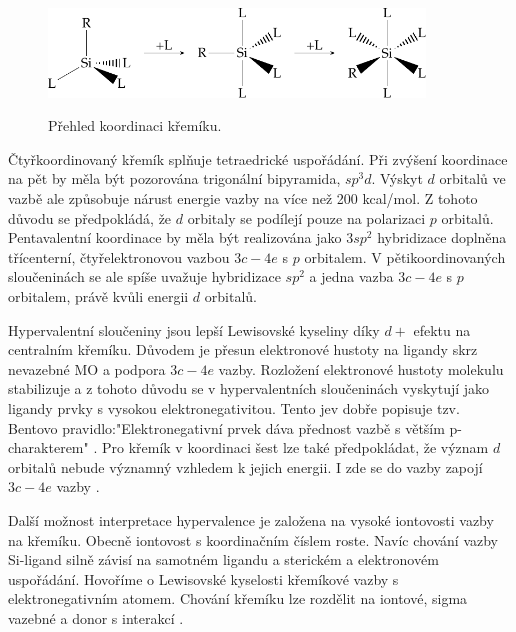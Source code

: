 \documentclass[
  digital, %
  table,   %
  lof,     %
  lot,     %
  oneside,
]{fithesis3}
\begin{document}
\begin{figure}
\caption{Přehled koordinaci křemíku.}
\center \includegraphics[width=10cm]{drawing.pdf} \label{prehled_koordinaci} \end{figure}

Čtyřkoordinovaný křemík splňuje tetraedrické uspořádání. Při zvýšení koordinace na pět by měla být pozorována trigonální bipyramida, $sp^3d$. Výskyt $d$ orbitalů ve vazbě ale způsobuje nárust energie vazby na více než 200 kcal/mol. Z tohoto důvodu se předpokládá, že $d$ orbitaly se podílejí pouze na polarizaci $p$ orbitalů. Pentavalentní koordinace by měla být realizována jako $3sp^2$ hybridizace doplněna třícenterní, čtyřelektronovou vazbou $3c-4e$ s $p$ orbitalem. V pětikoordinovaných sloučeninách se ale spíše uvažuje hybridizace $sp^2$ a jedna vazba $3c-4e$ s $p$ orbitalem, právě kvůli energii $d$ orbitalů.

Hypervalentní sloučeniny jsou lepší Lewisovské kyseliny díky $d+$ efektu na centralním křemíku. Důvodem je přesun elektronové hustoty na ligandy skrz nevazebné MO a podpora $3c-4e$ vazby. Rozložení elektronové hustoty molekulu stabilizuje a z tohoto důvodu se v hypervalentních sloučeninách vyskytují jako ligandy prvky s vysokou elektronegativitou. Tento jev dobře popisuje tzv. Bentovo pravidlo:"Elektronegativní prvek dáva přednost  vazbě s větším p-charakterem" \cite{hypervalentsiliconmacmillangroup2005}. Pro křemík v koordinaci šest lze také předpokládat, že význam $d$ orbitalů nebude významný vzhledem k jejich energii. I zde se do vazby zapojí $3c-4e$ vazby \cite{Wagler2014}.

Další možnost interpretace hypervalence je založena na vysoké iontovosti vazby na křemíku. Obecně iontovost s koordinačním číslem roste.
Navíc chování vazby Si-ligand silně závisí na samotném ligandu a sterickém a elektronovém uspořádání. Hovoříme o Lewisovské kyselosti křemíkové vazby s elektronegativním atomem. Chování křemíku lze rozdělit na iontové, sigma vazebné a donor s interakcí \cite{Wagler2014}.\\
\end{document}
